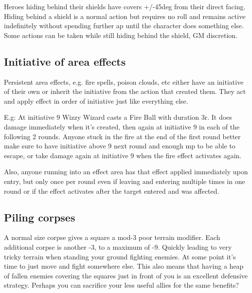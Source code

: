
Heroes hiding behind their shields have covers +/-45deg from their direct facing. Hiding behind a shield is a normal action but requires no roll and remains active indefinitely without spending further ap until the character does something else. Some actions can be taken while still hiding behind the shield, GM discretion.


\subsection*{Initiative of area effects}
Persistent area effects, e.g. fire spells, poison clouds, etc either have an initiative of their own or inherit the initiative from the action that created them. They act and apply effect in order of initiative just like everything else.

E.g: At initiative 9 Wizzy Wizard casts a Fire Ball with duration 3r. It does damage immediately when it's created, then again at initiative 9 in each of the following 2 rounds. Anyone stuck in the fire at the end of the first round better make sure to have initiative above 9 next round and enough mp to be able to escape, or take damage again at initiative 9 when the fire effect activates again.

Also, anyone running into an effect area has that effect applied immediately upon entry, but only once per round even if leaving and entering multiple times in one round or if the effect activates after the target entered and was affected.


\subsection*{Piling corpses}
A normal size corpse gives a square a mod-3 poor terrain modifier. Each additional corpse is another -3, to a maximum of -9. Quickly leading to very tricky terrain when standing your ground fighting enemies. At some point it's time to just move and fight somewhere else. This also means that having a heap of fallen enemies covering the squares just in front of you is an excellent defensive strategy. Perhaps you can sacrifice your less useful allies for the same benefits?

